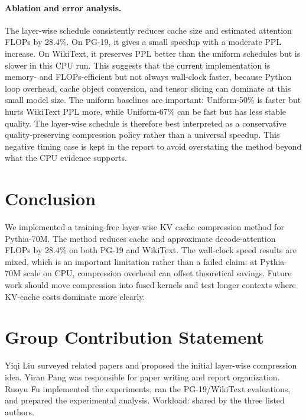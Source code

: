 \documentclass{article}
\begin{document}
\paragraph{Ablation and error analysis.}
The layer-wise schedule consistently reduces cache size and estimated attention
FLOPs by 28.4\%.  On PG-19, it gives a small speedup with a moderate PPL
increase.  On WikiText, it preserves PPL better than the uniform schedules but
is slower in this CPU run.  This suggests that the current implementation is
memory- and FLOPs-efficient but not always wall-clock faster, because Python
loop overhead, cache object conversion, and tensor slicing can dominate at this
small model size.  The uniform baselines are important: Uniform-50\% is faster
but hurts WikiText PPL more, while Uniform-67\% can be fast but has less stable
quality.  The layer-wise schedule is therefore best interpreted as a
conservative quality-preserving compression policy rather than a universal
speedup.  This negative timing case is kept in the report to avoid overstating
the method beyond what the CPU evidence supports.

\section{Conclusion}

We implemented a training-free layer-wise KV cache compression method for
Pythia-70M.  The method reduces cache and approximate decode-attention FLOPs by
28.4\% on both PG-19 and WikiText.  The wall-clock speed results are mixed,
which is an important limitation rather than a failed claim: at Pythia-70M scale
on CPU, compression overhead can offset theoretical savings.  Future work should
move compression into fused kernels and test longer contexts where KV-cache
costs dominate more clearly.

\section*{Group Contribution Statement}
Yiqi Liu surveyed related papers and proposed the initial layer-wise compression
idea.  Yiran Pang was responsible for paper writing and report organization.
Ruoyu Fu implemented the experiments, ran the PG-19/WikiText evaluations, and
prepared the experimental analysis.  Workload: shared by the three listed
authors.
\end{document}
